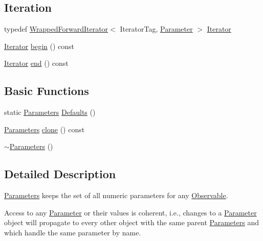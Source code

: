 \subsection*{Iteration}
\label{_amgrp86c1e32c05338b57578313d8a6fa892d}
 \begin{DoxyCompactItemize}
\item 
typedef \hyperlink{classeos_1_1WrappedForwardIterator}{WrappedForwardIterator}$<$ IteratorTag, \hyperlink{classeos_1_1Parameter}{Parameter} $>$ \hyperlink{classeos_1_1Parameters_ad4378a4b3c462f8aa122b3484bce1b4f}{Iterator}
\item 
\hyperlink{classeos_1_1WrappedForwardIterator}{Iterator} \hyperlink{classeos_1_1Parameters_aeef723f121d249fad9caa45cae111a90}{begin} () const 
\item 
\hyperlink{classeos_1_1WrappedForwardIterator}{Iterator} \hyperlink{classeos_1_1Parameters_a64f0ae769980d0945433023678f919dd}{end} () const 
\end{DoxyCompactItemize}
\subsection*{Basic Functions}
\label{_amgrp2386c9a1f1785edee33f374dd2db9b3d}
 \begin{DoxyCompactItemize}
\item 
static \hyperlink{classeos_1_1Parameters}{Parameters} \hyperlink{classeos_1_1Parameters_a1fa30b2210827623e6bf9f3ac4d2fd94}{Defaults} ()
\item 
\hyperlink{classeos_1_1Parameters}{Parameters} \hyperlink{classeos_1_1Parameters_a273f5bad065bc47b62981734a2e3576e}{clone} () const 
\item 
\hyperlink{classeos_1_1Parameters_aa1f509653fa20a2599a47706042685f1}{$\sim$Parameters} ()
\end{DoxyCompactItemize}


\subsection{Detailed Description}
\hyperlink{classeos_1_1Parameters}{Parameters} keeps the set of all numeric parameters for any \hyperlink{classeos_1_1Observable}{Observable}.

Access to any \hyperlink{classeos_1_1Parameter}{Parameter} or their values is coherent, i.e., changes to a \hyperlink{classeos_1_1Parameter}{Parameter} object will propagate to every other object with the same parent \hyperlink{classeos_1_1Parameters}{Parameters} and which handle the same parameter by name. 

